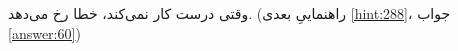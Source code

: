 \section{}
\paragraph{}\label{hint:77}
وقتی  درست کار نمی‌کند، خطا رخ می‌دهد. (راهنماییِ بعدی \ref{hint:288}، جواب \ref{answer:60})